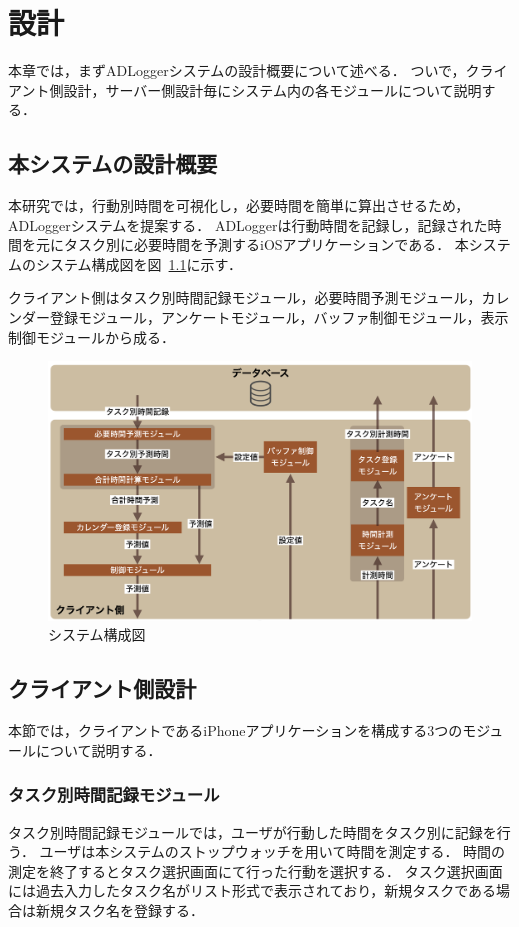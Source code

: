 \chapter{設計}
本章では，まずADLoggerシステムの設計概要について述べる．
ついで，クライアント側設計，サーバー側設計毎にシステム内の各モジュールについて説明する．

\section{本システムの設計概要}
本研究では，行動別時間を可視化し，必要時間を簡単に算出させるため，ADLoggerシステムを提案する．
ADLoggerは行動時間を記録し，記録された時間を元にタスク別に必要時間を予測するiOSアプリケーションである．
本システムのシステム構成図を図~\ref{fig:system}に示す．

クライアント側はタスク別時間記録モジュール，必要時間予測モジュール，カレンダー登録モジュール，アンケートモジュール，バッファ制御モジュール，表示制御モジュールから成る．

\begin{figure}[tb]
	\begin{center}
	\includegraphics[width=16cm]{images/5/3.png}
	\end{center}
	\caption{システム構成図}
	\label{fig:system}
\end{figure}

\section{クライアント側設計}
本節では，クライアントであるiPhoneアプリケーションを構成する3つのモジュールについて説明する．

\subsection{タスク別時間記録モジュール}
タスク別時間記録モジュールでは，ユーザが行動した時間をタスク別に記録を行う．
ユーザは本システムのストップウォッチを用いて時間を測定する．
時間の測定を終了するとタスク選択画面にて行った行動を選択する．
タスク選択画面には過去入力したタスク名がリスト形式で表示されており，新規タスクである場合は新規タスク名を登録する．


